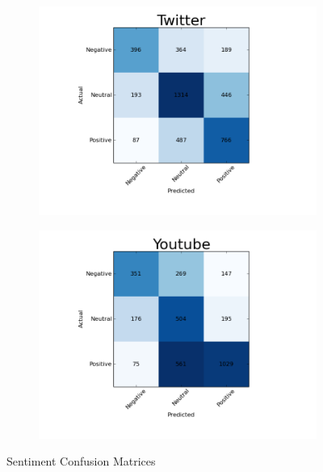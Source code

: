 \begin{figure}[t!]
    \centering
    \begin{subfigure}[b]{0.4\textwidth}
            \centering
            \includegraphics[width=\textwidth]{fig/Twitter.png}
            \caption{}
            \label{fig:twitter}
    \end{subfigure}
    \begin{subfigure}[b]{0.4\textwidth}
            \centering
            \includegraphics[width=\textwidth]{fig/Youtube.png}
            \caption{}
            \label{fig:youtube}
    \end{subfigure}
    \caption{Sentiment Confusion Matrices}
    \label{fig:confmat}
\end{figure}


